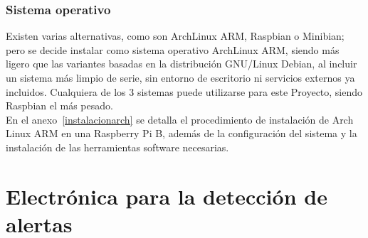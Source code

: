         \subsubsection{Sistema operativo}

        Existen varias alternativas, como son ArchLinux ARM, Raspbian o Minibian; pero se decide instalar como sistema operativo ArchLinux ARM, siendo más ligero que las variantes basadas en la distribución GNU/Linux Debian, al incluir un sistema más limpio de serie, sin entorno de escritorio ni servicios externos ya incluidos. Cualquiera de los 3 sistemas puede utilizarse para este Proyecto, siendo Raspbian el más pesado. \\

        En el anexo~\ref{instalacionarch} se detalla el procedimiento de instalación de Arch Linux ARM en una Raspberry Pi B, además de la configuración del sistema y la instalación de las herramientas software necesarias.

\section{Electrónica para la detección de alertas}

